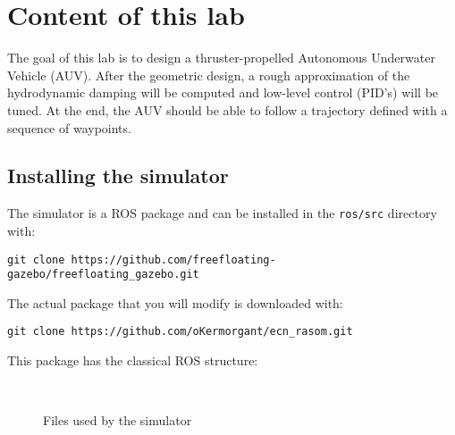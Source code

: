 \documentclass{ecnreport}
\begin{document}




\section{Content of this lab}

The goal of this lab is to design a thruster-propelled Autonomous Underwater Vehicle (AUV). After the geometric design, a rough approximation of the hydrodynamic damping will be computed
and low-level control (PID's) will be tuned. At the end, the AUV should be able to follow a trajectory defined with a sequence of waypoints.

\subsection{Installing the simulator}

The simulator is a ROS package and can be installed in the \texttt{ros/src} directory with:
\begin{center}
\begin{lstlisting}
git clone https://github.com/freefloating-gazebo/freefloating_gazebo.git
\end{lstlisting}
\end{center}

The actual package that you will modify is downloaded with:
\begin{center}
\begin{lstlisting}
git clone https://github.com/oKermorgant/ecn_rasom.git
\end{lstlisting}
\end{center}
This package has the classical ROS structure:
\begin{figure}[h]
\begin{minipage}{.25\linewidth} ~ \end{minipage}
\begin{minipage}{.5\linewidth}
\end{minipage}
\caption{Files used by the simulator}
\end{figure}
\end{document}
